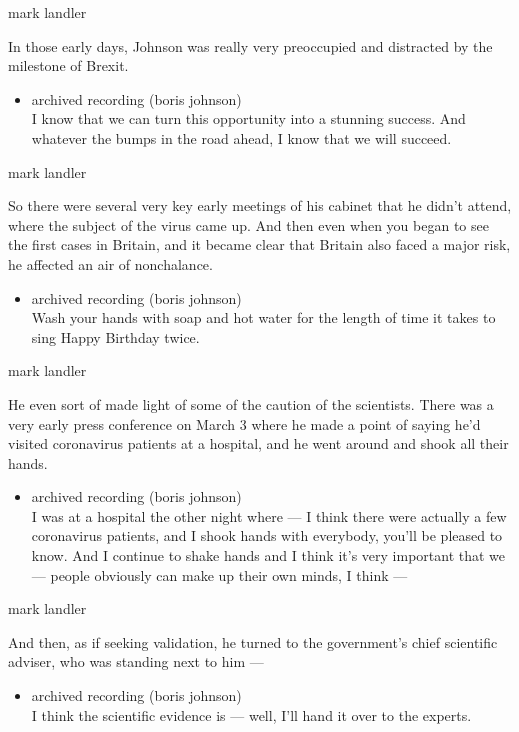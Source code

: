 mark landler

In those early days, Johnson was really very preoccupied and distracted
by the milestone of Brexit.

\begin{itemize}
\tightlist
\item
  archived recording (boris johnson)\\
  I know that we can turn this opportunity into a stunning success. And
  whatever the bumps in the road ahead, I know that we will succeed.
\end{itemize}

mark landler

So there were several very key early meetings of his cabinet that he
didn't attend, where the subject of the virus came up. And then even
when you began to see the first cases in Britain, and it became clear
that Britain also faced a major risk, he affected an air of nonchalance.

\begin{itemize}
\tightlist
\item
  archived recording (boris johnson)\\
  Wash your hands with soap and hot water for the length of time it
  takes to sing Happy Birthday twice.
\end{itemize}

mark landler

He even sort of made light of some of the caution of the scientists.
There was a very early press conference on March 3 where he made a point
of saying he'd visited coronavirus patients at a hospital, and he went
around and shook all their hands.

\begin{itemize}
\tightlist
\item
  archived recording (boris johnson)\\
  I was at a hospital the other night where --- I think there were
  actually a few coronavirus patients, and I shook hands with everybody,
  you'll be pleased to know. And I continue to shake hands and I think
  it's very important that we --- people obviously can make up their own
  minds, I think ---
\end{itemize}

mark landler

And then, as if seeking validation, he turned to the government's chief
scientific adviser, who was standing next to him ---

\begin{itemize}
\tightlist
\item
  archived recording (boris johnson)\\
  I think the scientific evidence is --- well, I'll hand it over to the
  experts.
\end{itemize}

